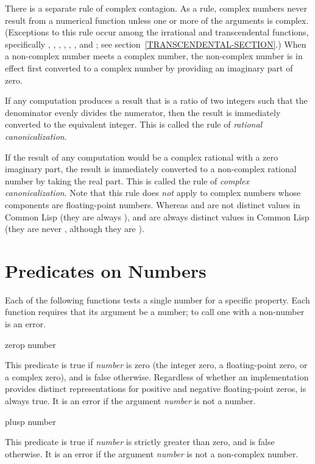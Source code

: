 There is a separate rule of complex contagion.
As a rule, complex numbers never result from a numerical function
unless one or more of the
arguments is complex.  (Exceptions to this
rule occur among the irrational and transcendental functions,
specifically , , ,
, , , and ;
see section~\ref{TRANSCENDENTAL-SECTION}.)
When a non-complex number meets a complex number, the non-complex
number is in effect first converted to a complex number by providing an
imaginary part of zero.

If any computation produces a result that is a ratio of
two integers such that the denominator evenly divides the
numerator, then the result is immediately converted to the equivalent
integer.  This is called the rule of \emph{rational canonicalization}.

If the result of any computation would be a complex rational
with a zero imaginary part, the result is immediately
converted to a non-complex rational number by taking the
real part.  This is called the rule of \emph{complex canonicalization}.
Note that this rule does \emph{not} apply to complex numbers whose components
are floating-point numbers.  Whereas  and  are not
distinct values in Common Lisp (they are always ),
 and  are always distinct values in Common Lisp
(they are never , although they are ).

\section{Predicates on Numbers}

Each of the following functions tests a single number for
a specific property.
Each function requires that its argument be
a number; to call one with a non-number is an error.

\begin{defun}[Function]
zerop number

This predicate is true if \emph{number} is zero (the integer zero,
a floating-point zero, or a complex zero), and is false otherwise.
Regardless of whether an implementation provides distinct representations
for positive and negative floating-point zeros,
 is always true.
It is an error if the argument \emph{number} is not a number.
\end{defun}

\begin{defun}[Function]
plusp number

This predicate is true if \emph{number} is strictly greater than zero,
and is false otherwise.
It is an error if the argument \emph{number} is not a non-complex number.
\end{defun}

